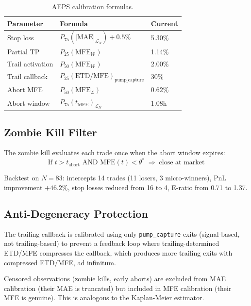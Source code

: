 \documentclass[11pt,a4paper]{article}
\begin{document}
\begin{table}[H]
\centering
\caption{AEPS calibration formulas.}
\begin{tabular}{lll}
\toprule
\textbf{Parameter} & \textbf{Formula} & \textbf{Current} \\
\midrule
Stop loss & $P_{75}(|\text{MAE}|_{\mathcal{L}_N}) + 0.5\%$ & 5.30\% \\
Partial TP & $P_{25}(\text{MFE}_{\mathcal{W}})$ & 1.14\% \\
Trail activation & $P_{50}(\text{MFE}_{\mathcal{W}})$ & 2.00\% \\
Trail callback & $P_{25}(\text{ETD/MFE})_{\text{pump\_capture}}$ & 30\% \\
Abort MFE & $P_{50}(\text{MFE}_{\mathcal{L}})$ & 0.62\% \\
Abort window & $P_{75}(t_{\text{MFE}})_{\mathcal{L}_N}$ & 1.08h \\
\bottomrule
\end{tabular}
\end{table}

\subsection{Zombie Kill Filter}

The zombie kill evaluates each trade once when the abort window expires:
\begin{equation}
\text{If } t > t_{\text{abort}} \text{ AND MFE}(t) < \theta^* \;\Longrightarrow\; \text{close at market}
\end{equation}

Backtest on $N=83$: intercepts 14 trades (11 losers, 3 micro-winners), PnL improvement $+46.2\%$, stop losses reduced from 16 to 4, E-ratio from 0.71 to 1.37.

\subsection{Anti-Degeneracy Protection}

The trailing callback is calibrated using only \texttt{pump\_capture} exits (signal-based, not trailing-based) to prevent a feedback loop where trailing-determined ETD/MFE compresses the callback, which produces more trailing exits with compressed ETD/MFE, ad infinitum.

Censored observations (zombie kills, early aborts) are excluded from MAE calibration (their MAE is truncated) but included in MFE calibration (their MFE is genuine). This is analogous to the Kaplan-Meier estimator.
\end{document}
